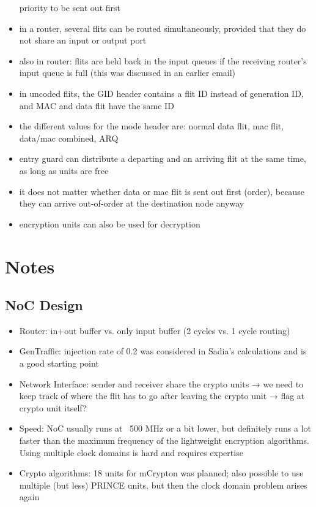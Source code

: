 \documentclass[
	paper=a4,
	fontsize=11pt,
	parskip=full %
]{scrreprt}
\begin{document}
\begin{itemize}
            priority to be sent out first
        \item in a router, several flits can be routed simultaneously, provided that
            they do not share an input or output port
        \item also in router: flits are held back in the input queues if the
            receiving router's input queue is full (this was discussed in an earlier
            email)
        \item in uncoded flits, the GID header contains a flit ID instead of
            generation ID, and MAC and data flit have the same ID
        \item the different values for the mode header are: normal data flit, mac
            flit, data/mac combined, ARQ
        \item entry guard can distribute a departing and an arriving flit at the same
            time, as long as units are free
        \item it does not matter whether data or mac flit is sent out first (order),
            because they can arrive out-of-order at the destination node anyway
        \item encryption units can also be used for decryption
    \end{itemize}

    \chapter{Notes}
    \section{NoC Design}
    \begin{itemize}
        \item Router: in+out buffer vs. only input buffer (2 cycles vs. 1 cycle routing)
        \item GenTraffic: injection rate of 0.2 was considered in Sadia's calculations and is a good starting point
        \item Network Interface: sender and receiver share the crypto units → we need to keep track of where the flit has to go after leaving the crypto unit → flag at crypto unit itself?
        \item Speed: NoC usually runs at ~500 MHz or a bit lower, but definitely runs a lot faster than the maximum frequency of the lightweight encryption algorithms. Using multiple clock domains is hard and requires expertise
        \item Crypto algorithms: 18 units for mCrypton was planned; also possible to use multiple (but less) PRINCE units, but then the clock domain problem arises again
    \end{itemize}
	
	\nocite{*} %
	\printbibliography
\end{document}
